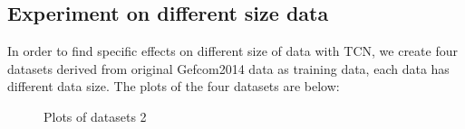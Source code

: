 \subsection{Experiment on different size data}
In order to find specific effects on different size of data with TCN, we create four datasets derived from original Gefcom2014 data as training data, each data has different data size. The plots of the four datasets are below:
\begin{figure}[H]
\centering
{}

\caption{Plots of datasets 2} 
\label{Plots of datasets 2}%
\end{figure}

